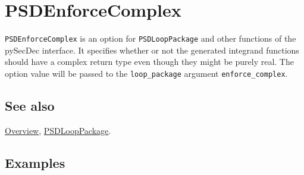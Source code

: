 \documentclass[../FeynHelpersManual.tex]{subfiles}
\begin{document}
\hypertarget{psdenforcecomplex}{
\section{PSDEnforceComplex}\label{psdenforcecomplex}}

\texttt{PSDEnforceComplex} is an option for \texttt{PSDLoopPackage} and
other functions of the pySecDec interface. It specifies whether or not
the generated integrand functions should have a complex return type even
though they might be purely real. The option value will be passed to the
\texttt{loop_package} argument \texttt{enforce_complex}.

\subsection{See also}

\hyperlink{toc}{Overview}, \hyperlink{psdlooppackage}{PSDLoopPackage}.

\subsection{Examples}
\end{document}
